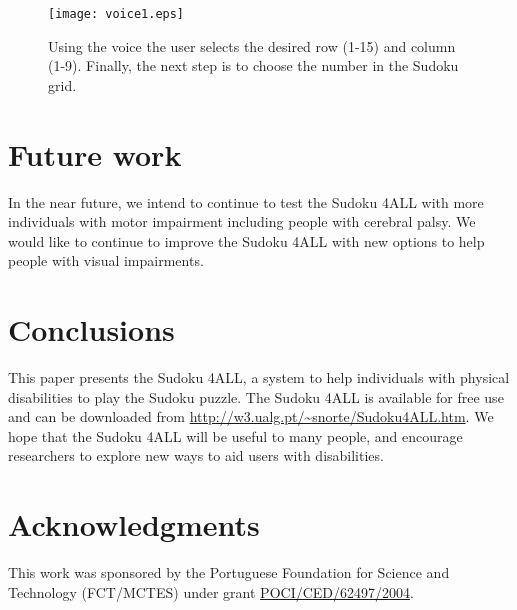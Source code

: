 \documentclass[doublespace,11pt]{article}
\begin{document}
\begin{spacing}{1}
\begin{figure}
\begin{center}  
\texttt{[image: voice1.eps]}  
\end{center}
\caption{Using the voice the user selects the desired row (1-15) and column (1-9). Finally, the next step 
is to choose the number in the Sudoku grid.}
\label{fig:SudokuVoice}
\end{figure}






\section{Future work}

In the near future, we intend to continue to test the Sudoku 4ALL with more individuals 
with motor impairment including people with cerebral palsy. We would like to continue to improve
the Sudoku 4ALL with new options to help people with visual impairments.



\section{Conclusions}

This paper presents the Sudoku 4ALL, a system to help individuals with physical disabilities 
to play the Sudoku puzzle. The Sudoku 4ALL is available for free use and can be downloaded 
from \url{http://w3.ualg.pt/~snorte/Sudoku4ALL.htm}. We hope that the Sudoku 4ALL will be useful to many 
people, and encourage researchers to explore new ways to aid users with disabilities.



\section*{Acknowledgments}
This work was sponsored by the Portuguese Foundation for Science and 
Technology (FCT/MCTES) under grant \url{POCI/CED/62497/2004}.








\end{spacing}
\end{document}
